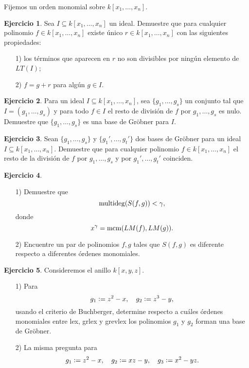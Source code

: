 \documentclass{article}
\theoremstyle{definition}
\newtheorem{ejerc}{Ejercicio}
\begin{document}

Fijemos un orden monomial sobre $k [x_1,\ldots,x_n]$.

\begin{ejerc}
  Sea $I \subseteq k [x_1,\ldots,x_n]$ un ideal. Demuestre que para cualquier
  polinomio $f \in k [x_1,\ldots,x_n]$ existe único $r \in k [x_1,\ldots,x_n]$
  con las siguientes propiedades:

  \begin{enumerate}
  \item[1)] los términos que aparecen en $r$ no son divisibles por ningún
    elemento de $LT (I)$;

  \item[2)] $f = g+r$ para algún $g \in I$.
  \end{enumerate}
\end{ejerc}

\begin{ejerc}
  Para un ideal $I \subseteq k [x_1,\ldots,x_n]$, sea $\{ g_1,\ldots,g_s \}$ un
  conjunto tal que $I = (g_1,\ldots,g_s)$ y para todo $f \in I$ el resto de
  división de $f$ por $g_1,\ldots,g_s$ es nulo. Demuestre que
  $\{ g_1,\ldots,g_s \}$ es una base de Gröbner para $I$.
\end{ejerc}

\begin{ejerc}
  Sean $\{ g_1, \ldots, g_s \}$ y $\{ g_1', \ldots, g_t' \}$ dos bases de
  Gröbner para un ideal $I \subseteq k [x_1,\ldots,x_n]$. Demuestre que para
  cualquier polinomio $f \in k [x_1,\ldots,x_n]$ el resto de la división de $f$
  por $g_1, \ldots, g_s$ y por $g_1', \ldots, g_t'$ coinciden.
\end{ejerc}

\begin{ejerc}
  ~

  \begin{enumerate}
  \item[1)] Demuestre que
    $$\operatorname{multideg} (S (f,g)) < \gamma,$$
    donde
    $$x^\gamma = \operatorname{mcm} (LM (f), LM (g)).$$

  \item[2)] Encuentre un par de polinomios $f,g$ tales que $S (f,g)$ es
    diferente respecto a diferentes órdenes monomiales.
  \end{enumerate}
\end{ejerc}

\begin{ejerc}
  Consideremos el anillo $k [x,y,z]$.

  \begin{enumerate}
  \item[1)] Para
    $$g_1 \mathrel{\mathop:}= z^2-x, \quad g_2 \mathrel{\mathop:}= z^3-y,$$
    usando el criterio de Buchberger, determine respecto a cuáles órdenes
    monomiales entre lex, grlex y grevlex los polinomios $g_1$ y $g_2$ forman
    una base de Gröbner.

  \item[2)] La misma pregunta para
    $$g_1 \mathrel{\mathop:}= z^2 - x, \quad g_2 \mathrel{\mathop:}= xz - y, \quad g_3 \mathrel{\mathop:}= x^2 - yz.$$
  \end{enumerate}
\end{ejerc}
\end{document}
